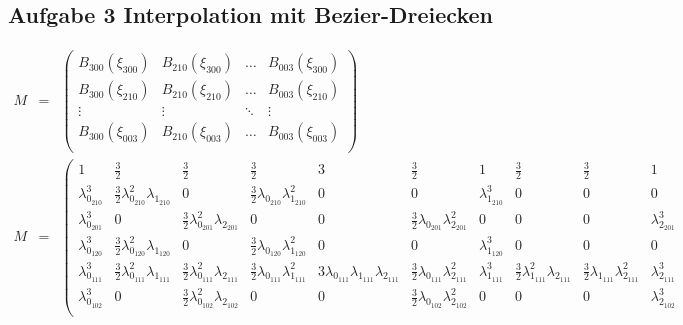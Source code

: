 
\begin{sideways}

    \parbox{\textheight}{
    
    \section*{Aufgabe 3 Interpolation mit Bezier-Dreiecken}
    \tiny
\begin{eqnarray}
    M &=&    
\left(\begin{matrix}
    B_{300}(\xi_{300}) &B_{210}(\xi_{300})& \dots  &B_{003}(\xi_{300})  \\
    B_{300}(\xi_{210}) &B_{210}(\xi_{210})& \dots  &B_{003}(\xi_{210})  \\
    \vdots & \vdots &\ddots & \vdots \\
    B_{300}(\xi_{003}) &B_{210}(\xi_{003})& \dots  &B_{003}(\xi_{003})  \\
\end{matrix}\right) \\
    M &=&
\left(\begin{matrix}
1 & \frac{3}{2} & \frac{3}{2} &\frac{3}{2} & 3 & \frac{3}{2} & 1 & \frac{3}{2} &\frac{3}{2} & 1  \\
\lambda_{0_{210}}^3 & \frac{3}{2} \lambda_{0_{210}}^2 \lambda_{1_{210}} & 0 & \frac{3}{2} \lambda_{0_{210}} \lambda_{1_{210}}^2 & 0 & 0 & \lambda_{1_{210}}^3 & 0 &0 & 0  \\
\lambda_{0_{201}}^3 & 0 & \frac{3}{2}\lambda_{0_{201}}^2 \lambda_{2_{201}} & 0 & 0 & \frac{3}{2} \lambda_{0_{201}} \lambda_{2_{201}}^2& 0 & 0 &0 & \lambda_{2_{201}}^3  \\
\lambda_{0_{120}}^3 & \frac{3}{2} \lambda_{0_{120}}^2 \lambda_{1_{120}} & 0 & \frac{3}{2} \lambda_{0_{120}} \lambda_{1_{120}}^2 & 0 & 0 & \lambda_{1_{120}}^3 & 0 &0 & 0  \\
\lambda_{0_{111}}^3 & \frac{3}{2} \lambda_{0_{111}}^2 \lambda_{1_{111}} & \frac{3}{2}\lambda_{0_{111}}^2 \lambda_{2_{111}} & \frac{3}{2} \lambda_{0_{111}} \lambda_{1_{111}}^2 & 3 \lambda_{0_{111}}\lambda_{1_{111}}\lambda_{2_{111}} & \frac{3}{2} \lambda_{0_{111}} \lambda_{2_{111}}^2& \lambda_{1_{111}}^3 & \frac{3}{2} \lambda_{1_{111}}^2 \lambda_{2_{111}} &\frac{3}{2} \lambda_{1_{111}}\lambda_{2_{111}}^2 & \lambda_{2_{111}}^3  \\
\lambda_{0_{102}}^3 & 0 & \frac{3}{2}\lambda_{0_{102}}^2 \lambda_{2_{102}} & 0 & 0 & \frac{3}{2} \lambda_{0_{102}} \lambda_{2_{102}}^2& 0 & 0 &0 & \lambda_{2_{102}}^3  \\

\end{matrix}
\end{eqnarray}}
\end{sideways}
